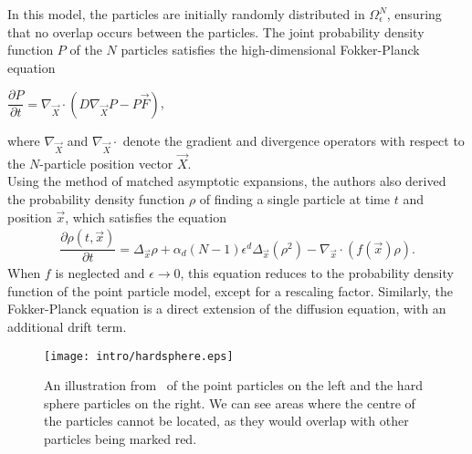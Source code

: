 In this model, the particles are initially randomly distributed in $\Omega^N_{\epsilon}$, ensuring that no overlap occurs between the particles.
The joint probability density function $P$ of the $N$ particles satisfies the high-dimensional Fokker-Planck equation
\begin{center}
	$\dfrac{\partial P}{\partial t} = \nabla_{\vec{X}} \cdot (D \nabla_{\vec{X}} P - P \vec{F})$,
\end{center}
where $\nabla_{\vec{X}}$ and $\nabla_{\vec{X}} \cdot$ denote the gradient and divergence operators with respect to the $N$-particle position vector $\vec{X}$.\\
Using the method of matched asymptotic expansions, the authors also derived the probability density function $\rho$ of finding a single particle at time $t$ and position $\vec{x}$, which satisfies the equation
\begin{align}
	\dfrac{\partial \rho (t, \vec{x})}{\partial t} = \Delta_{\vec{x}} \rho + \alpha_d (N - 1) \epsilon^d \Delta_{\vec{x}} (\rho^2) - \nabla_{\vec{x}} \cdot (f(\vec{x}) \rho).
\end{align}
When $f$ is neglected and $\epsilon \rightarrow 0$, this equation reduces to the probability density function of the point particle model, except for a rescaling factor.
Similarly, the Fokker-Planck equation is a direct extension of the diffusion equation, with an additional drift term.\\

\begin{figure}[h!]
	\centering
	\texttt{[image: intro/hardsphere.eps]}
	\caption{An illustration from~\cite{Bruna2012} of the point particles on the left and the hard sphere particles on the right. We can see areas where the centre of the particles cannot be located, as they would overlap with other particles being marked red. 
	}
	\label{fig:curved_phasefield}
\end{figure}



